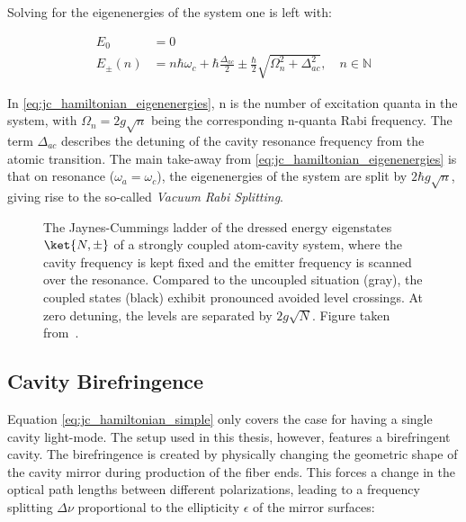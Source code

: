 Solving for the eigenenergies of the system one is left with:

\begin{align}
	E_0       & = 0                                                                                                                         \\
	E_\pm (n) & = n\hbar\omega_c + \hbar\frac{\Delta_{ac}}{2} \pm \frac{\hbar}{2}\sqrt{\Omega_{n}^2 + \Delta_{ac}^2}, \quad n\in \mathbb{N}
	\label{eq:jc_hamiltonian_eigenenergies}
\end{align}

In \eqref{eq:jc_hamiltonian_eigenenergies}, n is the number of excitation quanta in the system, with $\Omega_n=2g\sqrt{n}$ being the corresponding n-quanta Rabi frequency. The term $\Delta_{ac}$ describes the detuning of the cavity resonance frequency from the atomic transition.
The main take-away from \eqref{eq:jc_hamiltonian_eigenenergies} is that on resonance ($\omega_a = \omega_c$), the eigenenergies of the system are split by $2\hbar g\sqrt{n}$, giving rise to the so-called \textit{Vacuum Rabi Splitting}.

\begin{figure}[h]
	\centering
	
	\caption{The Jaynes-Cummings ladder of the dressed energy eigenstates $\ket{N,\pm}$ of a strongly coupled atom-cavity system, where the cavity frequency is kept fixed and the emitter frequency is scanned over the resonance. Compared to the uncoupled situation (gray), the coupled states (black) exhibit pronounced avoided level crossings. At zero detuning, the levels are separated by $2g\sqrt{N}$. Figure taken from~\cite{RempeReiserer2015}.}
\end{figure}


\subsection{Cavity Birefringence}

Equation \eqref{eq:jc_hamiltonian_simple} only covers the case for having a single cavity light-mode. The setup used in this thesis, however, features a birefringent cavity. The birefringence is created by physically changing the geometric shape of the cavity mirror during production of the fiber ends.\cite{ManuelBThesis2023} This forces a change in the optical path lengths between different polarizations, leading to a frequency splitting $\Delta\nu$ proportional to the ellipticity $\epsilon$ of the mirror surfaces:\cite{UphoffFreqSplit2015}


